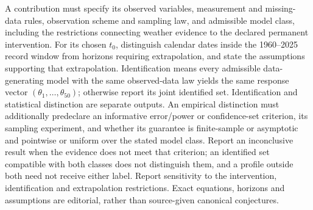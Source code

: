 \documentclass[11pt,a4paper]{article}
\begin{document}
A contribution must specify its observed variables, measurement and missing-data rules, observation scheme and sampling law, and admissible model class, including the restrictions connecting weather evidence to the declared permanent intervention. For its chosen \(t_0\), distinguish calendar dates inside the 1960--2025 record window from horizons requiring extrapolation, and state the assumptions supporting that extrapolation. Identification means every admissible data-generating model with the same observed-data law yields the same response vector \((\theta_1,\ldots,\theta_{50})\); otherwise report its joint identified set. Identification and statistical distinction are separate outputs. An empirical distinction must additionally predeclare an informative error/power or confidence-set criterion, its sampling experiment, and whether its guarantee is finite-sample or asymptotic and pointwise or uniform over the stated model class. Report an inconclusive result when the evidence does not meet that criterion; an identified set compatible with both classes does not distinguish them, and a profile outside both need not receive either label. Report sensitivity to the intervention, identification and extrapolation restrictions. Exact equations, horizons and assumptions are editorial, rather than source-given canonical conjectures.
\end{document}
